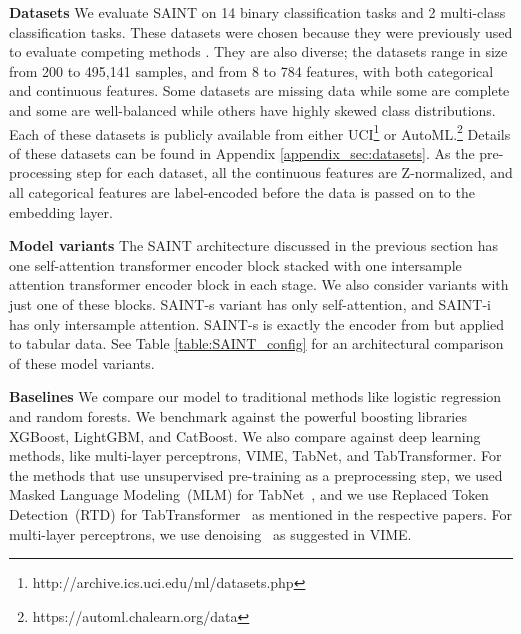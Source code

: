 \documentclass{article}
\begin{document}
\textbf{Datasets} We evaluate SAINT on 14 binary classification tasks and 2 multi-class classification tasks. These datasets were chosen because they were previously used to evaluate competing methods \cite{yoon2020vime,arik2019TabNet,huang2020tabtransformer}. They are also diverse; the datasets range in size from 200 to 495,141 samples, and from 8 to 784 features, with both categorical and continuous features. Some datasets are missing data while some are complete and some are well-balanced while others have highly skewed class distributions. Each of these datasets is publicly available from either UCI\footnote{http://archive.ics.uci.edu/ml/datasets.php} or AutoML.\footnote{https://automl.chalearn.org/data} Details of these datasets can be found in Appendix \ref{appendix_sec:datasets}. As the pre-processing step for each dataset, all the continuous features are Z-normalized, and all categorical features are label-encoded before the data is passed on to the embedding layer.

\textbf{Model variants} The SAINT architecture discussed in the previous section has one self-attention transformer encoder block stacked with one intersample attention transformer encoder block in each stage. We also consider variants with just one of these blocks. SAINT-s variant has only self-attention, and SAINT-i has only intersample attention. SAINT-s is exactly the encoder from \cite{vaswani2017attention} but applied to tabular data. See Table \ref{table:SAINT_config} for an architectural comparison of these model variants.




\textbf{Baselines} We compare our model to traditional methods like logistic regression and random forests. We benchmark against the powerful boosting libraries XGBoost, LightGBM, and CatBoost. We also compare against deep learning methods, like multi-layer perceptrons, VIME, TabNet, and TabTransformer. For the methods that use unsupervised pre-training as a preprocessing step, we used Masked Language Modeling~(MLM) for TabNet~\cite{devlin2018bert}, and we use Replaced Token Detection~(RTD) for TabTransformer~\cite{clark2020electra} as mentioned in the respective papers. For multi-layer perceptrons, we use denoising~\cite{vincent2008extracting} as suggested in VIME. 
\end{document}

